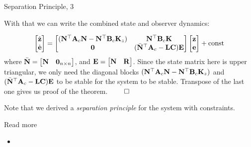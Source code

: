 \documentclass{beamer}
\begin{document}
\begin{frame}{Separation Principle, 3}
	\begin{flushleft}
		
		
		With that we can write the combined state and observer dynamics:
		
		\begin{equation}
			\label{e_ObserverError_State}
			\begin{bmatrix}
				\dot{\mathbf{z}} \\ \dot{\mathbf{e}}
			\end{bmatrix} 
			= 
			\begin{bmatrix}
				(\mathbf{N}^\top\mathbf{A}_c\mathbf{N} - \mathbf{N}^\top\mathbf{B}_c 
				\mathbf{K}_z) & \mathbf{N}^\top\mathbf{B}_c\mathbf{K} \\
				\mathbf{0} & (\bar{\mathbf{N}}^\top\mathbf{A}_c - \mathbf{L}\mathbf{C})\mathbf{E}
			\end{bmatrix}
			\begin{bmatrix}
				\mathbf{z} \\ \mathbf{e}
			\end{bmatrix} 
			+
			\text{const}
		\end{equation}
		where 
		$\bar{\mathbf{N}} = \begin{bmatrix}
			\mathbf{N} & \mathbf{0}_{n \times n}
		\end{bmatrix}$, 
		and
		$\mathbf{E} = \begin{bmatrix}
			\mathbf{N} & \mathbf{R}
		\end{bmatrix}$. 
		Since the state matrix here is upper triangular, we only need the diagonal blocks $(\mathbf{N}^\top\mathbf{A}_c\mathbf{N} - \mathbf{N}^\top\mathbf{B}_c\mathbf{K}_z)$ and $(\bar{\mathbf{N}}^\top\mathbf{A}_c - \mathbf{L}\mathbf{C})\mathbf{E}$ to be stable for the system to be stable. Transpose of the last one gives us proof of the theorem. $\qed$
		
		\bigskip
		
		Note that we derived a \emph{separation principle} for the system with constraints.
		
	\end{flushleft}
\end{frame}



\begin{frame}{Read more}
	
	\begin{itemize}
		
		\item {}
		
	\end{itemize}
	
\end{frame}



\myqrframe
\end{document}
